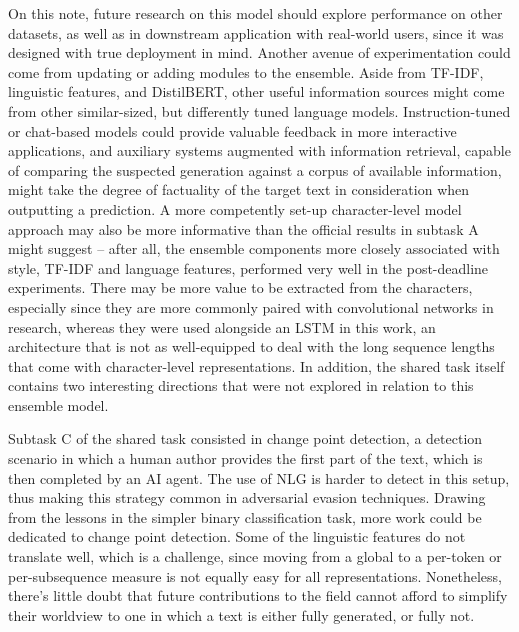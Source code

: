 On this note, future research on this model should explore performance on other datasets, as well as in downstream application with real-world users, since it was designed with true deployment in mind.
Another avenue of experimentation could come from updating or adding modules to the ensemble.
Aside from TF-IDF, linguistic features, and DistilBERT, other useful information sources might come from other similar-sized, but differently tuned language models.
Instruction-tuned or chat-based models could provide valuable feedback in more interactive applications, and auxiliary systems augmented with information retrieval, capable of comparing the suspected generation against a corpus of available information, might take the degree of factuality of the target text in consideration when outputting a prediction.
A more competently set-up character-level model approach may also be more informative than the official results in subtask A might suggest -- after all, the ensemble components more closely associated with style, TF-IDF and language features, performed very well in the post-deadline experiments.
There may be more value to be extracted from the characters, especially since they are more commonly paired with convolutional networks in research, whereas they were used alongside an LSTM in this work, an architecture that is not as well-equipped to deal with the long sequence lengths that come with character-level representations.
In addition, the shared task itself contains two interesting directions that were not explored in relation to this ensemble model.

Subtask C of the shared task consisted in change point detection, a detection scenario in which a human author provides the first part of the text, which is then completed by an AI agent.
The use of NLG is harder to detect in this setup, thus making this strategy common in adversarial evasion techniques.
Drawing from the lessons in the simpler binary classification task, more work could be dedicated to change point detection.
Some of the linguistic features do not translate well, which is a challenge, since moving from a global to a per-token or per-subsequence measure is not equally easy for all representations.
Nonetheless, there's little doubt that future contributions to the field cannot afford to simplify their worldview to one in which a text is either fully generated, or fully not.

